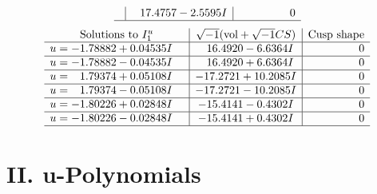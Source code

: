 \documentclass[1p]{elsarticle_modified}
\theoremstyle{definition}
\newcommand{\I}{\sqrt{-1}}
\begin{document}
$$\begin{array}{c|c|c}
 & \phantom{-}17.4757 - 2.5595 I & \phantom{-0.000000 } 0\\
 \hline 
 \end{array}$$\newpage$$\begin{array}{c|c|c}  
\text{Solutions to }I^u_{1}& \I (\text{vol} + \sqrt{-1}CS) & \text{Cusp shape}\\
 \hline 
\begin{aligned}
u &= -1.78882 + 0.04535 I\end{aligned}
 & \phantom{-}16.4920 - 6.6364 I & \phantom{-0.000000 } 0 \\ \hline\begin{aligned}
u &= -1.78882 - 0.04535 I\end{aligned}
 & \phantom{-}16.4920 + 6.6364 I & \phantom{-0.000000 } 0 \\ \hline\begin{aligned}
u &= \phantom{-}1.79374 + 0.05108 I\end{aligned}
 & -17.2721 + 10.2085 I & \phantom{-0.000000 } 0 \\ \hline\begin{aligned}
u &= \phantom{-}1.79374 - 0.05108 I\end{aligned}
 & -17.2721 - 10.2085 I & \phantom{-0.000000 } 0 \\ \hline\begin{aligned}
u &= -1.80226 + 0.02848 I\end{aligned}
 & -15.4141 - 0.4302 I & \phantom{-0.000000 } 0 \\ \hline\begin{aligned}
u &= -1.80226 - 0.02848 I\end{aligned}
 & -15.4141 + 0.4302 I & \phantom{-0.000000 } 0\\
 \hline 
 \end{array}$$\newpage
\newpage\renewcommand{\arraystretch}{1}
\centering \section*{ II. u-Polynomials}
\end{document}
